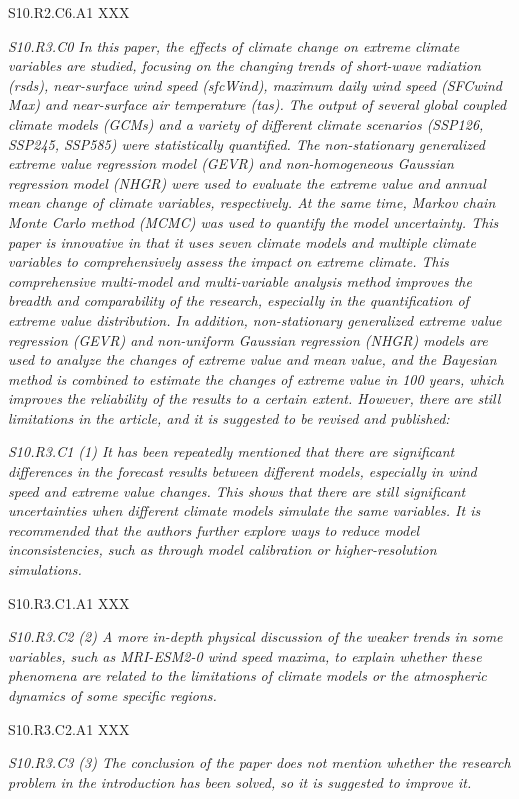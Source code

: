 \documentclass[a4paper,10pt]{article}
\begin{document}
	S10.R2.C6.A1 XXX

	\emph{S10.R3.C0 In this paper, the effects of climate change on extreme climate variables are studied, focusing on the changing trends of short-wave radiation (rsds), near-surface wind speed (sfcWind), maximum daily wind speed (SFCwind Max) and near-surface air temperature (tas). The output of several global coupled climate models (GCMs) and a variety of different climate scenarios (SSP126, SSP245, SSP585) were statistically quantified. The non-stationary generalized extreme value regression model (GEVR) and non-homogeneous Gaussian regression model (NHGR) were used to evaluate the extreme value and annual mean change of climate variables, respectively. At the same time, Markov chain Monte Carlo method (MCMC) was used to quantify the model uncertainty. This paper is innovative in that it uses seven climate models and multiple climate variables to comprehensively assess the impact on extreme climate. This comprehensive multi-model and multi-variable analysis method improves the breadth and comparability of the research, especially in the quantification of extreme value distribution. In addition, non-stationary generalized extreme value regression (GEVR) and non-uniform Gaussian regression (NHGR) models are used to analyze the changes of extreme value and mean value, and the Bayesian method is combined to estimate the changes of extreme value in 100 years, which improves the reliability of the results to a certain extent. However, there are still limitations in the article, and it is suggested to be revised and published:}

	\emph{S10.R3.C1 (1) It has been repeatedly mentioned that there are significant differences in the forecast results between different models, especially in wind speed and extreme value changes. This shows that there are still significant uncertainties when different climate models simulate the same variables. It is recommended that the authors further explore ways to reduce model inconsistencies, such as through model calibration or higher-resolution simulations.}

	S10.R3.C1.A1 XXX

	\emph{S10.R3.C2 (2) A more in-depth physical discussion of the weaker trends in some variables, such as MRI-ESM2-0 wind speed maxima, to explain whether these phenomena are related to the limitations of climate models or the atmospheric dynamics of some specific regions.}

	S10.R3.C2.A1 XXX

	\emph{S10.R3.C3 (3) The conclusion of the paper does not mention whether the research problem in the introduction has been solved, so it is suggested to improve it.}
\end{document}
